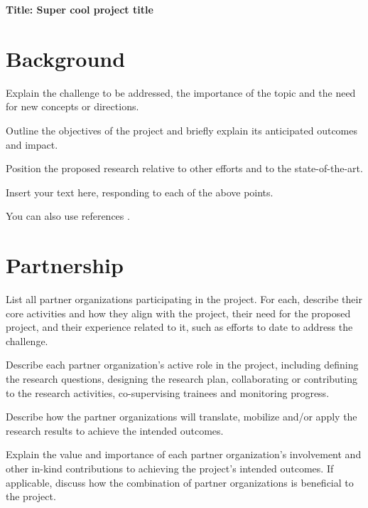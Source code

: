 \documentclass[french,
]{nserc-alliance}
\newcommand{\proposaltitle}{Super cool project title}
\begin{document}
\thispagestyle{firstpage}
\maketitle

\noindent \textbf{Title: \proposaltitle}

\section*{Background}
\ifinst\begin{instructions}
  \item Explain the challenge to be addressed, the importance of the topic and the need for new concepts or directions. 
  \item Outline the objectives of the project and briefly explain its anticipated outcomes and impact. 
  \item Position the proposed research relative to other efforts and to the state-of-the-art.
\end{instructions}\fi
  
\noindent Insert your text here, responding to each of the above points. 

You can also use references \cite{DBLPjournals/jsyml/Turing48,DBLPconf/afips/SolomonP76}.

\section*{Partnership}
\ifinst\begin{instructions}
  \item List all partner organizations participating in the project. For each, describe their core activities and how they align with the project, their need for the proposed project, and their experience related to it, such as efforts to date to address the challenge.
  \item	Describe each partner organization's active role in the project, including defining the research questions, designing the research plan, collaborating or contributing to the research activities, co-supervising trainees and monitoring progress.
  \item Describe how the partner organizations will translate, mobilize and/or apply the research results to achieve the intended outcomes. 
  \item Explain the value and importance of each partner organization's involvement and other in-kind contributions to achieving the project's intended outcomes. If applicable, discuss how the combination of partner organizations is beneficial to the project. 
\end{instructions}\fi
  
\end{document}
